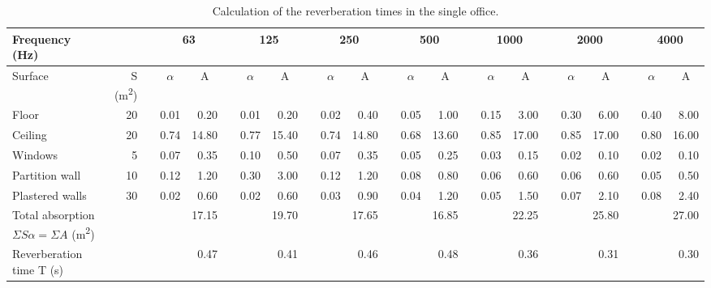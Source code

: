 \begin{sidewaystable}[htbp]
	\caption{Calculation of the reverberation times in the single office.}
	\label{tbl:reverb_office}
	\centering
	\begin{tabular}{@{}m{3cm}rrrrrrrrrrrrrrrrrrrrrr@{}}
		\toprule
		Frequency (Hz) & \multicolumn{1}{l}{} & \multicolumn{1}{l}{} & \multicolumn{2}{c}{63} & \multicolumn{1}{c}{} & \multicolumn{2}{c}{125} & \multicolumn{1}{c}{} & \multicolumn{2}{c}{250} & \multicolumn{1}{c}{} & \multicolumn{2}{c}{500} & \multicolumn{1}{c}{} & \multicolumn{2}{c}{1000} & \multicolumn{1}{c}{} & \multicolumn{2}{c}{2000} & \multicolumn{1}{c}{} & \multicolumn{2}{c}{4000} \\ \midrule
		Surface & S (m\textsuperscript{2}) & \multicolumn{1}{l}{} & \multicolumn{1}{c}{$\alpha$} & \multicolumn{1}{c}{A} & \multicolumn{1}{c}{} & \multicolumn{1}{c}{$\alpha$} & \multicolumn{1}{c}{A} & \multicolumn{1}{c}{} & \multicolumn{1}{c}{$\alpha$} & \multicolumn{1}{c}{A} & \multicolumn{1}{c}{} & \multicolumn{1}{c}{$\alpha$} & \multicolumn{1}{c}{A} & \multicolumn{1}{c}{} & \multicolumn{1}{c}{$\alpha$} & \multicolumn{1}{c}{A} & \multicolumn{1}{c}{} & \multicolumn{1}{c}{$\alpha$} & \multicolumn{1}{c}{A} & \multicolumn{1}{c}{} & \multicolumn{1}{c}{$\alpha$} & \multicolumn{1}{c}{A} \\
		Floor & 20 &  & 0.01 & 0.20 &  & 0.01 & 0.20 &  & 0.02 & 0.40 &  & 0.05 & 1.00 &  & 0.15 & 3.00 &  & 0.30 & 6.00 &  & 0.40 & 8.00 \\
		Ceiling & 20 &  & 0.74 & 14.80 &  & 0.77 & 15.40 &  & 0.74 & 14.80 &  & 0.68 & 13.60 &  & 0.85 & 17.00 &  & 0.85 & 17.00 &  & 0.80 & 16.00 \\
		Windows & 5 &  & 0.07 & 0.35 &  & 0.10 & 0.50 &  & 0.07 & 0.35 &  & 0.05 & 0.25 &  & 0.03 & 0.15 &  & 0.02 & 0.10 &  & 0.02 & 0.10 \\
		Partition wall & 10 &  & 0.12 & 1.20 &  & 0.30 & 3.00 &  & 0.12 & 1.20 &  & 0.08 & 0.80 &  & 0.06 & 0.60 &  & 0.06 & 0.60 &  & 0.05 & 0.50 \\
		Plastered walls & 30 &  & 0.02 & 0.60 &  & 0.02 & 0.60 &  & 0.03 & 0.90 &  & 0.04 & 1.20 &  & 0.05 & 1.50 &  & 0.07 & 2.10 &  & 0.08 & 2.40 \\ \midrule
		Total absorption $\Sigma S \alpha = \Sigma A$ (m\textsuperscript{2}) &  &  &  & 17.15 &  &  & 19.70 &  &  & 17.65 &  &  & 16.85 &  &  & 22.25 &  &  & 25.80 &  &  & 27.00 \\
		Reverberation time T (s) &  &  &  & 0.47 &  &  & 0.41 &  &  & 0.46 &  &  & 0.48 &  &  & 0.36 &  &  & 0.31 &  &  & 0.30 \\ \bottomrule
	\end{tabular}
\end{sidewaystable}